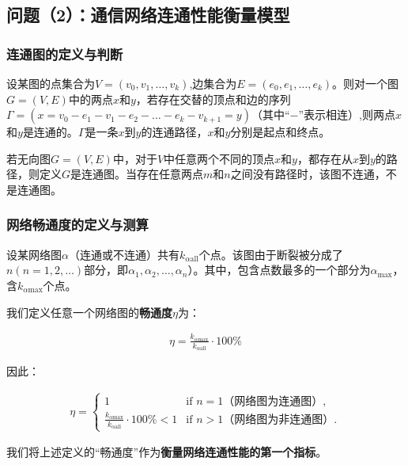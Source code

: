 \documentclass{article}
\begin{document}
\subsection{问题（2）：通信网络连通性能衡量模型}
\label{ssub:问题\chinese{subsection}（2）：通信网络连通性能衡量模型}

\subsubsection{连通图的定义与判断}
\label{连通图的定义与判断}

设某图的点集合为$V=(v_0,v_1,\dots,v_k)$,边集合为$E=(e_0,e_1,\dots,e_k)$。则对一个图$G=(V,E)$中的两点$x$和$y$，若存在交替的顶点和边的序列$\varGamma=(x=v_0-e_1-v_1-e_2-\dots-e_k-v_{k+1}=y)$（其中“$-$”表示相连）,则两点$x$和$y$是连通的。$\varGamma$是一条$x$到$y$的连通路径，$x$和$y$分别是起点和终点\cite{欧雯-416}。

若无向图$G=(V,E)$中，对于$V$中任意两个不同的顶点$x$和$y$，都存在从$x$到$y$的路径，则定义$G$是连通图。当存在任意两点$m$和$n$之间没有路径时，该图不连通，不是连通图\cite{种鹏云-417}。

\subsubsection{网络畅通度的定义与测算}
\label{网络畅通度的定义与测算}

设某网络图$\alpha$（连通或不连通）共有$k_{\alpha\text{all}}$个点。该图由于断裂被分成了$n(n=1,2,\dots)$部分，即$\alpha_1,\alpha_2,\dots,\alpha_n$）。其中，包含点数最多的一个部分为$\alpha_{\text{max}}$，含$k_{\alpha\text{max}}$个点\cite{李倩-420}。

我们定义任意一个网络图的\textbf{畅通度}$\eta$\cite{孙成雨申卯兴-419}为：

\begin{align}
	\eta=\frac{k_{\alpha\text{max}}}{k_{\alpha\text{all}}}\cdot 100\%
\end{align}

因此：

\begin{align}
	\eta = \left\{
		\begin{array}{rl}
			1 & \text{if } n=1（网络图为连通图）,\\
			\frac{k_{\alpha\text{max}}}{k_{\alpha\text{all}}}\cdot 100\% < 1& \text{if } n>1（网络图为非连通图）.
	\end{array} \right.
\end{align}

我们将上述定义的“畅通度”作为\textbf{衡量网络连通性能的第一个指标}。
\end{document}
